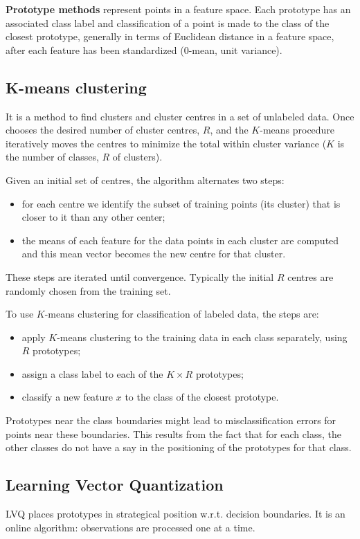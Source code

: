 \documentclass[12pt, letterpaper]{article}
\theoremstyle{definition}
\begin{document}
\textbf{Prototype methods} represent points in a feature space. Each prototype has an associated class label and classification of a point is made to the class of the closest prototype, generally in terms of Euclidean distance in a feature space, after each feature has been standardized (0-mean, unit variance).

\subsection{K-means clustering}
It is a method to find clusters and cluster centres in a set of unlabeled data. Once chooses the desired number of cluster centres, $R$, and the $K$-means procedure iteratively moves the centres to minimize the total within cluster variance ($K$ is the number of classes, $R$ of clusters).

Given an initial set of centres, the algorithm alternates two steps:
\begin{itemize}
\item for each centre we identify the subset of training points (its cluster) that is closer to it than any other center;
\item the means of each feature for the data points in each cluster are computed and this mean vector becomes the new centre for that cluster.
\end{itemize}
These steps are iterated until convergence. Typically the initial $R$ centres are randomly chosen from the training set.

To use $K$-means clustering for classification of labeled data, the steps are:
\begin{itemize}
\item apply $K$-means clustering to the training data in each class separately, using $R$ prototypes;
\item assign a class label to each of the $K \times R$ prototypes;
\item classify a new feature $x$ to the class of the closest prototype.
\end{itemize}
Prototypes near the class boundaries might lead to misclassification errors for points near these boundaries. This results from the fact that for each class, the other classes do not have a say in the positioning of the prototypes for that class.

\subsection{Learning Vector Quantization}
LVQ places prototypes in strategical position w.r.t. decision boundaries. It is an online algorithm: observations are processed one at a time.
\end{document}
